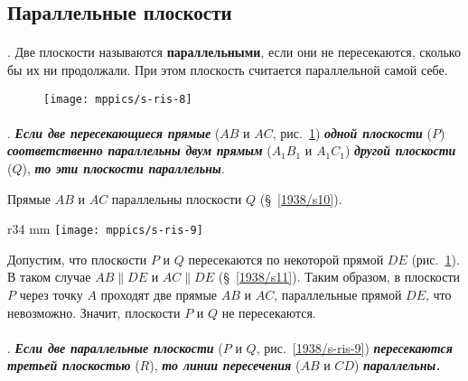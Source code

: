 \subsection*{Параллельные плоскости}

\paragraph{}\label{1938/s14}
.
Две плоскости называются \textbf{параллельными}, если они не пересекаются, сколько бы их ни продолжали.
При этом плоскость считается параллельной самой себе.

\begin{figure}[!ht]
\centering
\texttt{[image: mppics/s-ris-8]}
\caption{}\label{1938/s-ris-8}
\end{figure}

\paragraph{}\label{1938/s15}
. \textbf{\emph{Если две пересекающиеся прямые}} ($AB$ и $AC$, рис.~\ref{1938/s-ris-8}) \textbf{\emph{одной плоскости}} ($P$) \textbf{\emph{соответственно параллельны двум прямым}} ($A_1B_1$ и $A_1C_1$) \textbf{\emph{другой плоскости}} ($Q$), \textbf{\emph{то эти плоскости параллельны}}.

Прямые $AB$ и $AC$ параллельны плоскости $Q$ (§~\ref{1938/s10}).

\begin{wrapfigure}{r}{34 mm}
\centering
\texttt{[image: mppics/s-ris-9]}
\caption{}\label{1938/s-ris-9}
\end{wrapfigure}

Допустим, что плоскости $P$ и $Q$ пересекаются по некоторой прямой $DE$ (рис.~\ref{1938/s-ris-8}).
В таком случае $AB \parallel DE$ и $AC \parallel DE$ (§~\ref{1938/s11}).
Таким образом, в плоскости $P$ через точку $A$ проходят две прямые $AB$ и $AC$, параллельные прямой $DE$, что невозможно.
Значит, плоскости $P$ и $Q$ не пересекаются.

\paragraph{}\label{1938/s16}
\mbox{.} \textbf{\emph{Если две параллельные плоскости}} ($P$ и $Q$, рис.~\ref{1938/s-ris-9}) \textbf{\emph{пересекаются третьей плоскостью}} ($R$), \textbf{\emph{то линии пересечения}} ($AB$ и $CD$) \textbf{\emph{параллельны.}}

